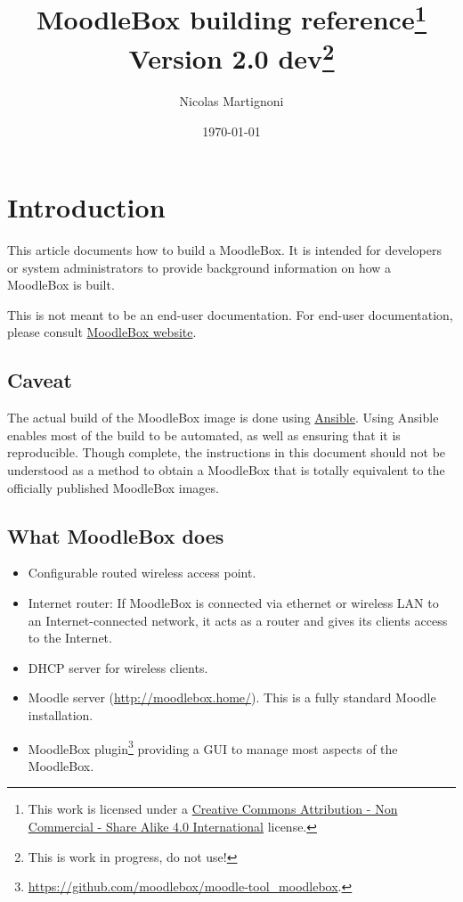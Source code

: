 \documentclass[12pt]{article}
\begin{document}
\title{MoodleBox building reference\footnote{This work is licensed under a \href{http://creativecommons.org/licenses/by-nc-sa/4.0/}{Creative Commons Attribution - Non Commercial - Share Alike  4.0 International} license.}\\
Version 2.0 dev\footnote{This is work in progress, do not use!}}
\date{\today} %
\author{Nicolas Martignoni}
\maketitle

\begingroup
\setlength{\parskip}{3pt plus1pt minus1pt}
\tableofcontents
\endgroup
\clearpage

\section{Introduction}

This article documents how to build a MoodleBox.
It is intended for developers or system administrators to provide background information on how a MoodleBox is built.

This is not meant to be an end-user documentation.
For end-user documentation, please consult \href{https://moodlebox.net/}{MoodleBox website}.

\subsection{Caveat}

The actual build of the MoodleBox image is done using \href{https://www.ansible.com/}{Ansible}.
Using Ansible enables most of the build to be automated, as well as ensuring that it is reproducible.
Though complete, the instructions in this document should not be understood as a method to obtain a MoodleBox that is totally equivalent to the officially published MoodleBox images.

\subsection{What MoodleBox does}

\begin{itemize}
\item Configurable routed wireless access point.
\item Internet router: If MoodleBox is connected via ethernet or wireless LAN to an Internet-connected network, it acts as a router and gives its clients access to the Internet.
\item DHCP server for wireless clients.
\item Moodle server (\url{http://moodlebox.home/}).
This is a fully standard Moodle installation.
\item MoodleBox plugin\footnote{\url{https://github.com/moodlebox/moodle-tool_moodlebox}.} providing a GUI to manage most aspects of the MoodleBox.
\end{itemize}
\end{document}
